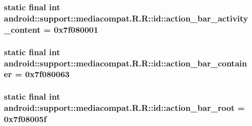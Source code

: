 \hypertarget{classandroid_1_1support_1_1mediacompat_1_1_r_1_1id_436f491462dce3fc4d38df521b151b0c}{
\subsubsection[{action\_\-bar\_\-activity\_\-content}]{\setlength{\rightskip}{0pt plus 5cm}static final int android::support::mediacompat.R.R::id::action\_\-bar\_\-activity\_\-content = 0x7f080001}}
\label{classandroid_1_1support_1_1mediacompat_1_1_r_1_1id_436f491462dce3fc4d38df521b151b0c}


\hypertarget{classandroid_1_1support_1_1mediacompat_1_1_r_1_1id_d707c3e1a2c8a7e8a0aed98a4562c556}{
\subsubsection[{action\_\-bar\_\-container}]{\setlength{\rightskip}{0pt plus 5cm}static final int android::support::mediacompat.R.R::id::action\_\-bar\_\-container = 0x7f080063}}
\label{classandroid_1_1support_1_1mediacompat_1_1_r_1_1id_d707c3e1a2c8a7e8a0aed98a4562c556}


\hypertarget{classandroid_1_1support_1_1mediacompat_1_1_r_1_1id_8d5f25857eeafe439954a621128973cb}{
\subsubsection[{action\_\-bar\_\-root}]{\setlength{\rightskip}{0pt plus 5cm}static final int android::support::mediacompat.R.R::id::action\_\-bar\_\-root = 0x7f08005f}}
\label{classandroid_1_1support_1_1mediacompat_1_1_r_1_1id_8d5f25857eeafe439954a621128973cb}


